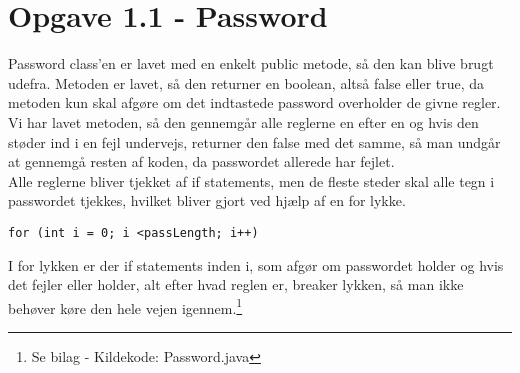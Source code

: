\section{Opgave 1.1 - Password}

Password class'en er lavet med en enkelt public metode, så den kan blive brugt udefra. Metoden er lavet, så den returner en boolean, altså false eller true, da metoden kun skal afgøre om det indtastede password overholder de givne regler. \\
Vi har lavet metoden, så den gennemgår alle reglerne en efter en og hvis den støder ind i en fejl undervejs, returner den false med det samme, så man undgår at gennemgå resten af koden, da passwordet allerede har fejlet.\\
Alle reglerne bliver tjekket af if statements, men de fleste steder skal alle tegn i passwordet tjekkes, hvilket bliver gjort ved hjælp af en for lykke.

\begin{center}
    \texttt{for (int i = 0; i \textless passLength; i++)}
\end{center}

\noindent I for lykken er der if statements inden i, som afgør om passwordet holder og hvis det fejler eller holder, alt efter hvad reglen er, breaker lykken, så man ikke behøver køre den hele vejen igennem.\footnote{Se bilag - Kildekode: Password.java}